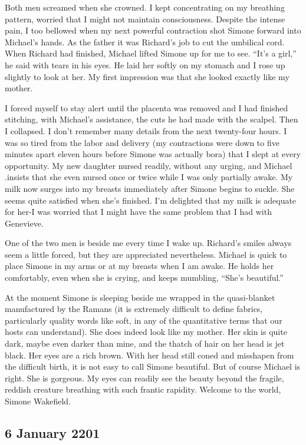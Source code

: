 \documentclass[]{article}
\begin{document}
Both men screamed when she crowned. I kept concentrating on my breathing pattern, worried that I might not maintain consciousness. Despite the intense pain, I too bellowed when my next powerful contraction shot Simone forward into Michael’s hands. As the father it was Richard’s job to cut the umbilical cord. When Richard had finished, Michael lifted Simone up for me to see. “It’s a girl,” he said with tears in his eyes. He laid her softly on my stomach and I rose up slightly to look at her. My first impression was that she looked exactly like my mother.

I forced myself to stay alert until the placenta was removed and I had finished stitching, with Michael’s assistance, the cuts he had made with the scalpel. Then I collapsed. I don’t remember many details from the next twenty-four hours. I was so tired from the labor and delivery (my contractions were down to five minutes apart eleven hours before Simone was actually bora) that I slept at every opportunity. My new daughter nursed readily, without any urging, and Michael .insists that she even nursed once or twice while I was only partially awake. My milk now surges into my breasts immediately after Simone begins to suckle. She seems quite satisfied when she’s finished. I’m delighted that my milk is adequate for her-I was worried that I might have the same problem that I had with Genevieve.

One of the two men is beside me every time I wake up. Richard’s smiles always seem a little forced, but they are appreciated nevertheless. Michael is quick to place Simone in my arms or at my breasts when I am awake. He holds her comfortably, even when she is crying, and keeps mumbling, “She’s beautiful.”

At the moment Simone is sleeping beside me wrapped in the quasi-blanket manufactured by the Ramans (it is extremely difficult to define fabrics, particularly quality words like soft, in any of the quantitative terms that our hosts can understand). She does indeed look like my mother. Her skin is quite dark, maybe even darker than mine, and the thatch of hair on her head is jet black. Her eyes are a rich brown. With her head still coned and misshapen from the difficult birth, it is not easy to call Simone beautiful. But of course Michael is right. She is gorgeous. My eyes can readily see the beauty beyond the fragile, reddish creature breathing with such frantic rapidity. Welcome to the world, Simone Wakefield.

\subsection{6 January 2201}
\end{document}
